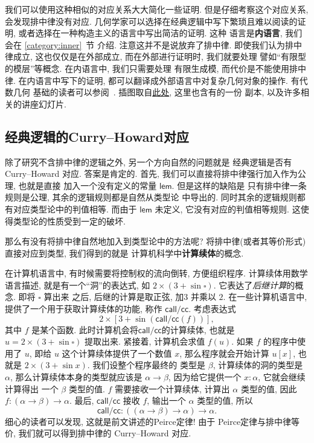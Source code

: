 \documentclass[UTF8]{ctexbook}
\newcommand{\cons}[1]{\textsf{#1}}
\theoremstyle{plain}
\theoremstyle{definition}
\theoremstyle{remark}
\begin{document}
我们可以使用这种相似的对应关系大大简化一些证明.
但是仔细考察这个对应关系, 会发现排中律没有对应.
几何学家可以选择在经典逻辑中写下繁琐且难以阅读的证明,
或者选择在一种构造主义的语言中写出简洁的证明. 这种
语言是\textbf{内语言}, 我们会在 \ref{category:inner}~节
介绍. 注意这并不是说放弃了排中律. 即使我们认为排中律成立,
这也仅仅是在外部成立, 而在外部进行证明时, 我们就要处理
譬如“有限型的模层”等概念. 在内语言中, 我们只需要处理
有限生成模, 而代价是不能使用排中律. 在内语言中写下的证明,
都可以翻译成外部语言中对复杂几何对象的操作. 有代数几何
基础的读者可以参阅~\cite{blechschmidt:2021:internal}.
插图取自\href{https://github.com/iblech/internal-methods}{此处},
这里也含有\cite{blechschmidt:2021:internal}的一份
副本, 以及许多相关的讲座幻灯片.

\subsection{经典逻辑的Curry--Howard对应}\label{ch:classical}

除了研究不含排中律的逻辑之外, 另一个方向自然的问题就是
经典逻辑是否有 Curry--Howard 对应. 答案是肯定的.
首先, 我们可以直接将排中律强行加入作为公理, 也就是直接
加入一个没有定义的常量 \(\cons{lem}\). 但是这样的缺陷是
只有排中律一条规则是公理, 其余的逻辑规则都是自然从类型论
中导出的. 同时其余的逻辑规则都有对应类型论中的判值相等.
而由于 \(\cons{lem}\) 未定义, 它没有对应的判值相等规则.
这使得类型论的性质受到一定的破坏.

那么有没有将排中律自然地加入到类型论中的方法呢?
将排中律(或者其等价形式)直接对应到类型, 我们得到的就是
计算机科学中\textbf{计算续体}的概念.

在计算机语言中,
有时候需要将控制权的流向倒转, 方便组织程序.
计算续体用数学语言描述, 就是有一个“洞”的表达式,
如 \(2 \times (3 + \sin \square)\).
它表达了\emph{后继计算}的概念. 即将 \(\square\) 算出来
之后, 后继的计算是取正弦, 加\(3\) 并乘以 \(2\).
在一些计算机语言中, 提供了一个用于获取计算续体的功能,
称作 \(\cons{call/cc}\). 考虑表达式
\[2 \times [3 + \sin(\cons{call/cc}(f))],\]
其中 \(f\) 是某个函数.
此时计算机会将\(\cons{call/cc}\)的计算续体, 也就是
\(u = 2 \times (3 + \sin \square)\) 提取出来.
紧接着, 计算机会求值 \(f(u)\).
如果 \(f\) 的程序中使用了 \(u\), 即给
\(u\) 这个计算续体提供了一个数值 \(x\),
那么程序就会开始计算 \(u[x]\), 也就是
\(2 \times (3 + \sin x)\). 我们设整个程序最终的
类型是 \(\beta\), 计算续体的洞的类型是 \(\alpha\),
那么计算续体本身的类型就应该是 \(\alpha \to \beta\),
因为给它提供一个 \(x : \alpha\), 它就会继续计算得出
一个 \(\beta\) 类型的值. \(f\) 需要接收一个计算续体,
计算出 \(\alpha\) 类型的值, 因此
\(f : (\alpha \to \beta) \to\alpha\). 最后,
\(\cons{call/cc}\) 接收 \(f\), 输出一个 \(\alpha\)
类型的值, 所以
\[\cons{call/cc} : ((\alpha \to \beta)\to\alpha)\to\alpha.\]
细心的读者可以发现, 这就是前文讲述的Peirce定律! 由于
Peirce定律与排中律等价, 我们就可以得到排中律的
Curry--Howard 对应.
\end{document}
